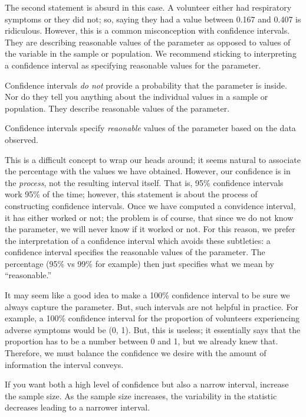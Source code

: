 \documentclass[]{book}
\theoremstyle{plain}
\theoremstyle{mydefn}
\theoremstyle{myexmpl}
\theoremstyle{remark}
\let\BeginKnitrBlock\begin \let\EndKnitrBlock\end
\let\BeginKnitrBlock\begin \let\EndKnitrBlock\end
\begin{document}
The second statement is absurd in this case. A volunteer either had
respiratory symptoms or they did not; so, saying they had a value
between 0.167 and 0.407 is ridiculous. However, this is a common
misconception with confidence intervals. They are describing reasonable
values of the parameter as opposed to values of the variable in the
sample or population. We recommend sticking to interpreting a confidence
interval as specifying reasonable values for the parameter.

\BeginKnitrBlock{rmdtip}
Confidence intervals \emph{do not} provide a probability that the
parameter is inside. Nor do they tell you anything about the individual
values in a sample or population. They describe reasonable values of the
parameter.
\EndKnitrBlock{rmdtip}

\BeginKnitrBlock{rmdkeyidea}
Confidence intervals specify \emph{reaonable} values of the parameter
based on the data observed.
\EndKnitrBlock{rmdkeyidea}

This is a difficult concept to wrap our heads around; it seems natural
to associate the percentage with the values we have obtained. However,
our confidence is in the \emph{process}, not the resulting interval
itself. That is, 95\% confidence intervals work 95\% of the time;
however, this statement is about the process of constructing confidence
intervals. Once we have computed a convidence interval, it has either
worked or not; the problem is of course, that since we do not know the
parameter, we will never know if it worked or not. For this reason, we
prefer the interpretation of a confidence interval which avoids these
subtleties: a confidence interval specifies the reasonable values of the
parameter. The percentage (95\% vs 99\% for example) then just specifies
what we mean by ``reasonable.''

It may seem like a good idea to make a 100\% confidence interval to be
sure we always capture the parameter. But, such intervals are not
helpful in practice. For example, a 100\% confidence interval for the
proportion of volunteers experiencing adverse symptoms would be (0, 1).
But, this is useless; it essentially says that the proportion has to be
a number between 0 and 1, but we already knew that. Therefore, we must
balance the confidence we desire with the amount of information the
interval conveys.

\BeginKnitrBlock{rmdtip}
If you want both a high level of confidence but also a narrow interval,
increase the sample size. As the sample size increases, the variability
in the statistic decreases leading to a narrower interval.
\EndKnitrBlock{rmdtip}
\end{document}
